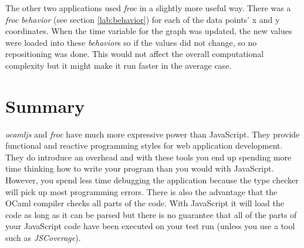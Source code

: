 The other two applications used \emph{froc} in a slightly more useful way. There was a \emph{froc} \emph{behavior} (see section \ref{lab:behavior}) for each of the data points' x and y coordinates. When the time variable for the graph was updated, the new values were loaded into these \emph{behavior}s so if the values did not change, so no repositioning was done. This would not affect the overall computational complexity but it might make it run faster in the average case.

\section{Summary}
\emph{ocamljs} and \emph{froc} have much more expressive power than JavaScript. They provide functional and reactive programming styles for web application development. They do introduce an overhead and with these tools you end up spending more time thinking how to write your program than you would with JavaScript. However, you spend less time debugging the application because the type checker will pick up most programming errors. There is also the advantage that the OCaml compiler checks all parts of the code. With JavaScript it will load the code as long as it can be parsed but there is no guarantee that all of the parts of your JavaScript code have been executed on your test run (unless you use a tool such as \emph{JSCoverage}\cite{bib:jscover}).
